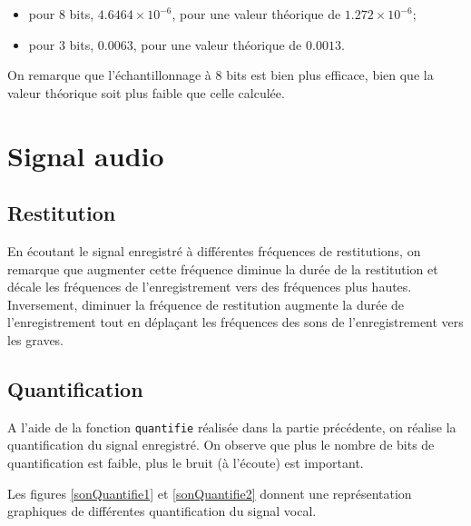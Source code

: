 \documentclass[french]{article}
\begin{document}
\begin{itemize}
	\item pour 8 bits, $4.6464 \times 10^{-6}$, pour une valeur théorique de $1.272 \times 10^{-6}$;
	\item pour 3 bits, $0.0063$, pour une valeur théorique de $0.0013$.
\end{itemize}
On remarque que l'échantillonnage à 8 bits est bien plus efficace, bien que la valeur théorique soit plus faible que celle calculée.

\section{ Signal audio}

\subsection{ Restitution}

En écoutant le signal enregistré à différentes fréquences de restitutions, on remarque que augmenter cette fréquence diminue la durée de la restitution et décale les fréquences de l'enregistrement vers des fréquences plus hautes. Inversement, diminuer la fréquence de restitution augmente la durée de l'enregistrement tout en déplaçant les fréquences des sons de l'enregistrement vers les graves.

\subsection{ Quantification}

A l'aide de la fonction \verb`quantifie` réalisée dans la partie précédente, on réalise la quantification du signal enregistré. On observe que plus le nombre de bits de quantification est faible, plus le bruit (à l'écoute) est important.

Les figures \ref{sonQuantifie1} et \ref{sonQuantifie2} donnent une représentation graphiques de différentes quantification du signal vocal.
\end{document}
